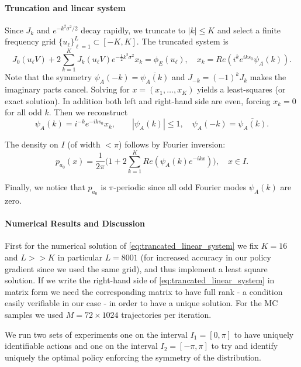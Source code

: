 \documentclass[reqno, 11pt]{amsart}%
\theoremstyle{definition}
\begin{document}
\paragraph{Truncation and linear system}
Since $J_k$ and $e^{-k^2\sigma^2/2}$ decay rapidly, we truncate to $|k|\le K$ and select a finite frequency grid $\{u_\ell\}_{\ell=1}^L\subset[-K,K]$. The truncated system is
\begin{equation}
\label{eq:trancated_linear_system}
 J_0(u_\ell V) + 2\sum_{k=1}^{K} J_k(u_\ell V)e^{-\frac12k^2\sigma^2}x_k = \phi_E(u_\ell), \quad x_k=Re(i^ke^{iks_0}\psi_A(k)).
\end{equation}
Note that the symmetry $\psi_A(-k) = \overline{\psi_A(k)}$ and $J_{-k} = (-1)^k J_k$ makes the imaginary parts cancel. Solving for $x=(x_1,\dots,x_K)$ yields a least-squares (or exact solution). In addition both left and right-hand side are even, forcing $x_k=0$ for all odd $k$. Then we reconstruct
\begin{equation}
 \psi_A(k) = i^{-k}e^{-iks_0}x_k, \qquad |\psi_A(k)|\le 1,\quad \psi_A(-k)=\overline{\psi_A(k)}.
\end{equation}

The density on $I$ (of width $<\pi$) follows by Fourier inversion:
\begin{equation}
 p_{a_0}(x) = \frac{1}{2\pi}\Big(1+2\sum_{k=1}^{K}Re(\psi_A(k)e^{-ikx})\Big),\quad x\in I.
\end{equation}

Finally, we notice that $p_{a_0}$ is $\pi$-periodic since all odd Fourier modes $\psi_A(k)$ are zero. 

\paragraph{Numerical Results and Discussion}
First for the numerical solution of \eqref{eq:trancated_linear_system} we fix $K=16$ and $L>>K$ in particular $L=8001$ (for increased accuracy in our policy gradient since we used the same grid), and thus implement a least square solution. If we write the right-hand side  of \eqref{eq:trancated_linear_system} in matrix form we need the corresponding matrix to have full rank - a condition easily verifiable in our case - in order to have a unique solution. For the MC samples we used $M=72 \times 1024$ trajectories per iteration. 

We run two sets of experiments one on the interval $I_1=[0,\pi]$ to have uniquely identifiable actions and one on the interval $I_2=[-\pi,\pi]$ to try and identify uniquely the optimal policy enforcing the symmetry of the distribution. 
\end{document}
